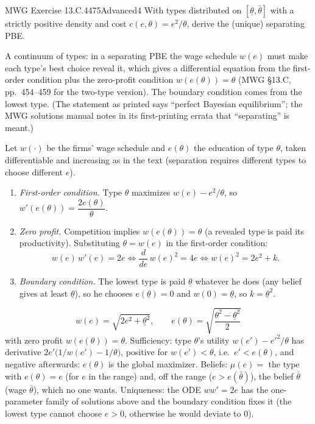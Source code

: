 \begin{exsol}{MWG Exercise 13.C.4}{475}{Advanced}{4}
\asked With types distributed on $[\underline{\theta}, \bar{\theta}]$ with a strictly positive density and cost
$c(e, \theta) = e^2/\theta$, derive the (unique) separating PBE.

\method A continuum of types: in a separating PBE the wage schedule $w(e)$ must make each type's best choice
reveal it, which gives a differential equation from the first-order condition plus the zero-profit
condition $w(e(\theta)) = \theta$ (MWG \S13.C, pp.~454--459 for the two-type version). The boundary
condition comes from the lowest type. (The statement as printed says ``perfect Bayesian equilibrium''; the
MWG solutions manual notes in its first-printing errata that ``separating'' is meant.)

\solution Let $w(\cdot)$ be the firms' wage schedule and $e(\theta)$ the education of type $\theta$, taken
differentiable and increasing as in the text (separation requires different types to choose different $e$).
\begin{enumerate}[label=\arabic*.]
  \item \emph{First-order condition.} Type $\theta$ maximizes $w(e) - e^2/\theta$, so
  $w'(e(\theta)) = \dfrac{2e(\theta)}{\theta}$.
  \item \emph{Zero profit.} Competition implies $w(e(\theta)) = \theta$ (a revealed type is paid its
  productivity). Substituting $\theta = w(e)$ in the first-order condition:
  \[
    w(e)\,w'(e) = 2e \iff \frac{d}{de}\, w(e)^2 = 4e \iff w(e)^2 = 2e^2 + k .
  \]
  \item \emph{Boundary condition.} The lowest type is paid $\underline{\theta}$ whatever he does (any belief
  gives at least $\underline{\theta}$), so he chooses $e(\underline{\theta}) = 0$ and $w(0) = \underline{\theta}$, so
  $k = \underline{\theta}^2$.
\end{enumerate}
\[
  \boxed{\ w(e) = \sqrt{2e^2 + \underline{\theta}^2}, \qquad e(\theta) = \sqrt{\frac{\theta^2 - \underline{\theta}^2}{2}}\ }
\]
with zero profit $w(e(\theta)) = \theta$. Sufficiency: type $\theta$'s utility $w(e') - e'^2/\theta$ has derivative
$2e'\bigl(1/w(e') - 1/\theta\bigr)$, positive for $w(e') < \theta$, i.e.\ $e' < e(\theta)$, and negative afterwards:
$e(\theta)$ is the global maximizer. Beliefs: $\mu(e) = $ the type with $e(\theta) = e$ (for $e$ in the range) and,
off the range ($e > e(\bar{\theta})$), the belief $\bar{\theta}$ (wage $\bar{\theta}$), which no one wants.
Uniqueness: the ODE $w w' = 2e$ has the one-parameter family of solutions above and the boundary
condition fixes it (the lowest type cannot choose $e > 0$, otherwise he would deviate to $0$).


\end{exsol}
